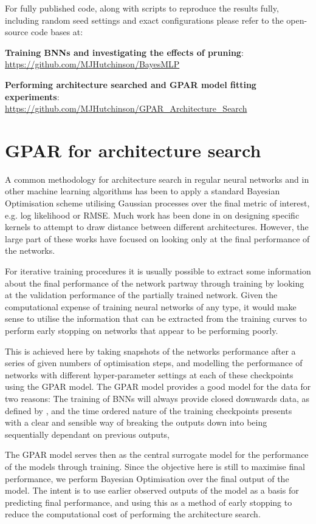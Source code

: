 For fully published code, along with scripts to reproduce the results fully, including random seed settings and exact configurations please refer to the open-source code bases at:

\textbf{Training BNNs and investigating the effects of pruning}:\\\url{https://github.com/MJHutchinson/BayesMLP}

\textbf{Performing architecture searched and GPAR model fitting experiments}:\\\url{https://github.com/MJHutchinson/GPAR_Architecture_Search}


\section{GPAR for architecture search}

A common methodology for architecture search in regular neural networks and in other machine learning algorithms has been to apply a standard Bayesian Optimisation scheme utilising Gaussian processes over the final metric of interest, e.g. log likelihood or RMSE. Much work has been done in on designing specific kernels to attempt to draw distance between different architectures. However, the large part of these works have focused on looking only at the final performance of the networks. 

For iterative training procedures it is usually possible to extract some information about the final performance of the network partway through training by looking at the validation performance of the partially trained network. Given the computational expense of training neural networks of any type, it would make sense to utilise the information that can be extracted from the training curves to perform early stopping on networks that appear to be performing poorly. 

This is achieved here by taking snapshots of the networks performance after a series of  given numbers of optimisation steps, and modelling the performance of networks with different hyper-parameter settings at each of these checkpoints using the GPAR model. The GPAR model provides a good model for the data for two reasons: The training of BNNs will always provide closed downwards data, as defined by \citet{Requeima2018}, and the time ordered nature of the training checkpoints presents with a clear and sensible way of breaking the outputs down into being sequentially dependant on previous outputs, 

The GPAR model serves then as the central surrogate model for the performance of the models through training. Since the objective here is still to maximise final performance, we perform Bayesian Optimisation over the final output of the model. The intent is to use earlier observed outputs of the model as a basis for predicting final performance, and using this as a method of early stopping to reduce the computational cost of performing the architecture search. 

